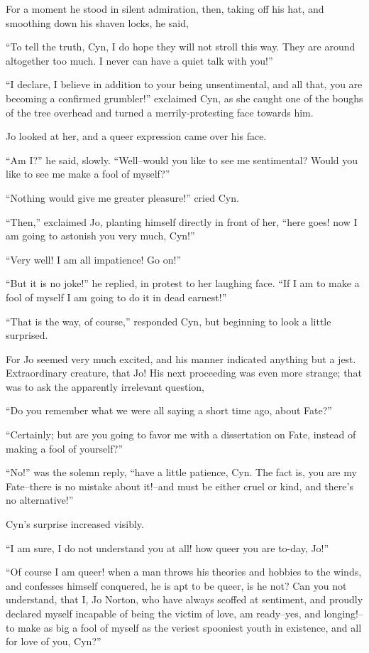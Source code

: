 For a moment he stood in silent admiration, then, taking off his hat,
and smoothing down his shaven locks, he said,

``To tell the truth, Cyn, I do hope they will not stroll this way. They
are around altogether too much. I never can have a quiet talk with you!''

``I declare, I believe in addition to your being unsentimental, and all
that, you are becoming a confirmed grumbler!'' exclaimed Cyn, as she
caught one of the boughs of the tree overhead and turned a
merrily-protesting face towards him.

Jo looked at her, and a queer expression came over his face.

``Am I?'' he said, slowly. ``Well--would you like to see me sentimental?
Would you like to see me make a fool of myself?''

``Nothing would give me greater pleasure!'' cried Cyn.

``Then,'' exclaimed Jo, planting himself directly in front of her, ``here
goes! now I am going to astonish you very much, Cyn!''

``Very well! I am all impatience! Go on!''

``But it is no joke!'' he replied, in protest to her laughing face. ``If I
am to make a fool of myself I am going to do it in dead earnest!''

``That is the way, of course,'' responded Cyn, but beginning to look a
little surprised.

For Jo seemed very much excited, and his manner indicated anything but a
jest. Extraordinary creature, that Jo! His next proceeding was even more
strange; that was to ask the apparently irrelevant question,

``Do you remember what we were all saying a short time ago, about Fate?''

``Certainly; but are you going to favor me with a dissertation on Fate,
instead of making a fool of yourself?''

``No!'' was the solemn reply, ``have a little patience, Cyn. The fact is,
you are my Fate--there is no mistake about it!--and must be either cruel
or kind, and there's no alternative!''

Cyn's surprise increased visibly.

``I am sure, I do not understand you at all! how queer you are to-day,
Jo!''

``Of course I am queer! when a man throws his theories and hobbies to the
winds, and confesses himself conquered, he is apt to be queer, is he
not? Can you not understand, that I, Jo Norton, who have always scoffed
at sentiment, and proudly declared myself incapable of being the victim
of love, am ready--yes, and longing!--to make as big a fool of myself as
the veriest spooniest youth in existence, and all for love of you, Cyn?''

